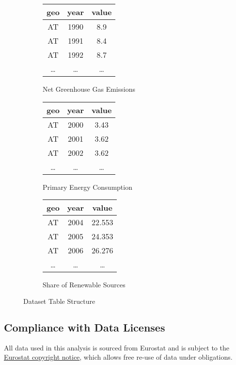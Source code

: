 \documentclass{article}
\begin{document}
\begin{figure}[h!]
    \centering
    \begin{subfigure}[b]{0.3\textwidth}
        \centering
        \begin{tabular}{c c c}
            geo & year & value \\
            \hline\hline
            AT & 1990 & 8.9 \\
            AT & 1991 & 8.4 \\
            AT & 1992 & 8.7 \\
            \dots & \dots & \dots
        \end{tabular}
        \caption{Net Greenhouse Gas Emissions}
        \label{tab:emissions}
    \end{subfigure}
    \hfill
    \begin{subfigure}[b]{0.3\textwidth}
        \centering
        \begin{tabular}{c c c}
            geo & year & value \\
            \hline\hline
            AT & 2000 & 3.43 \\
            AT & 2001 & 3.62 \\
            AT & 2002 & 3.62 \\
            \dots & \dots & \dots
        \end{tabular}
        \caption{Primary Energy Consumption}
        \label{tab:consumption}
    \end{subfigure}
    \hfill
    \begin{subfigure}[b]{0.3\textwidth}
        \centering
        \begin{tabular}{c c c}
            geo & year & value \\
            \hline\hline
            AT & 2004 & 22.553 \\
            AT & 2005 & 24.353 \\
            AT & 2006 & 26.276 \\
            \dots & \dots & \dots
        \end{tabular}
        \caption{Share of Renewable Sources}
        \label{tab:share}
    \end{subfigure}
    \caption{Dataset Table Structure}
    \label{fig:three_tables}
\end{figure}

\subsection*{Compliance with Data Licenses}
All data used in this analysis is sourced from Eurostat and is subject to the
\href{https://ec.europa.eu/eurostat/about-us/policies/copyright}{Eurostat copyright notice},
which allows free re-use of data under obligations.
\end{document}
